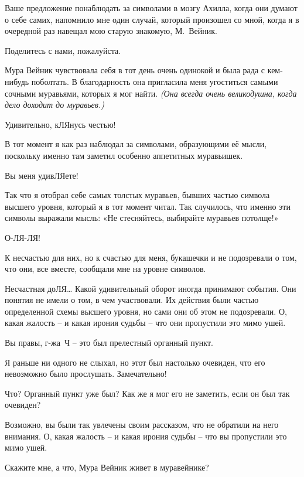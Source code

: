 \documentclass[../main.tex]{subfiles}
\begin{document}
\begin{dialogue}
 Ваше предложение понаблюдать за символами в мозгу Ахилла, когда они думают о себе самих, напомнило мне один случай, который произошел со мной, когда я в очередной раз навещал мою старую знакомую, М.~Вейник.

 Поделитесь с нами, пожалуйста.

 Мура Вейник чувствовала себя в тот день очень одинокой и была рада с кем-нибудь поболтать. В благодарность она пригласила меня угоститься самыми сочными муравьями, которых я мог найти. \emph{(Она всегда очень великодушна, когда дело доходит до муравьев.)}

 Удивительно, кЛЯнусь честью!

 В тот момент я как раз наблюдал за символами, образующими её мысли, поскольку именно там заметил особенно аппетитных муравьишек.

 Вы меня удивЛЯете!

 Так что я отобрал себе самых толстых муравьев, бывших частью символа высшего уровня, который я в тот момент читал. Так случилось, что именно эти символы выражали мысль: «Не стесняйтесь, выбирайте муравьев потолще!»

 О-ЛЯ-ЛЯ!

 К несчастью для них, но к счастью для меня, букашечки и не подозревали о том, что они, все вместе, сообщали мне на уровне символов.

 Несчастная доЛЯ\ldots{} Какой удивительный оборот иногда принимают события. Они понятия не имели о том, в чем участвовали. Их действия были частью определенной схемы высшего уровня, но сами они об этом не подозревали. О, какая жалость \--- и какая ирония судьбы \--- что они пропустили это мимо ушей.

 Вы правы, г-жа~Ч \--- это был прелестный органный пункт.

 Я раньше ни одного не слыхал, но этот был настолько очевиден, что его невозможно было прослушать. Замечательно!

 Что? Органный пункт уже был? Как же я мог его не заметить, если он был так очевиден?

 Возможно, вы были так увлечены своим рассказом, что не обратили на него внимания. О, какая жалость \--- и какая ирония судьбы \--- что вы пропустили это мимо ушей.

 Скажите мне, а что, Мура Вейник живет в муравейнике?


\end{dialogue}
\end{document}
